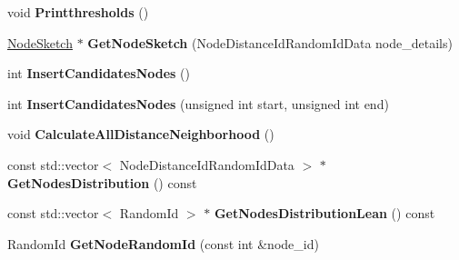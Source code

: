 \begin{DoxyCompactItemize}
\item 
\hypertarget{classall__distance__sketch_1_1GraphSketch_a76a7bed0b3f7d3769ecbeb334a0734b8}{}void {\bfseries Printthresholds} ()\label{classall__distance__sketch_1_1GraphSketch_a76a7bed0b3f7d3769ecbeb334a0734b8}

\item 
\hypertarget{classall__distance__sketch_1_1GraphSketch_a696af8492f42fbbb60afbc2ff2a68a96}{}\hyperlink{classall__distance__sketch_1_1NodeSketch}{Node\+Sketch} $\ast$ {\bfseries Get\+Node\+Sketch} (Node\+Distance\+Id\+Random\+Id\+Data node\+\_\+details)\label{classall__distance__sketch_1_1GraphSketch_a696af8492f42fbbb60afbc2ff2a68a96}

\item 
\hypertarget{classall__distance__sketch_1_1GraphSketch_a5f82eda7cb2dc9ad9460283c026861e4}{}int {\bfseries Insert\+Candidates\+Nodes} ()\label{classall__distance__sketch_1_1GraphSketch_a5f82eda7cb2dc9ad9460283c026861e4}

\item 
\hypertarget{classall__distance__sketch_1_1GraphSketch_aa630b4a199d612823fde932ed70916cd}{}int {\bfseries Insert\+Candidates\+Nodes} (unsigned int start, unsigned int end)\label{classall__distance__sketch_1_1GraphSketch_aa630b4a199d612823fde932ed70916cd}

\item 
\hypertarget{classall__distance__sketch_1_1GraphSketch_a84dbd59d7a2b5b300f07ca93a8002260}{}void {\bfseries Calculate\+All\+Distance\+Neighborhood} ()\label{classall__distance__sketch_1_1GraphSketch_a84dbd59d7a2b5b300f07ca93a8002260}

\item 
\hypertarget{classall__distance__sketch_1_1GraphSketch_ae31e8b23fc7063927b2368a06bc57adb}{}const std\+::vector$<$ Node\+Distance\+Id\+Random\+Id\+Data $>$ $\ast$ {\bfseries Get\+Nodes\+Distribution} () const \label{classall__distance__sketch_1_1GraphSketch_ae31e8b23fc7063927b2368a06bc57adb}

\item 
\hypertarget{classall__distance__sketch_1_1GraphSketch_af463db872f2cc5cc635dffe4aaf136e6}{}const std\+::vector$<$ Random\+Id $>$ $\ast$ {\bfseries Get\+Nodes\+Distribution\+Lean} () const \label{classall__distance__sketch_1_1GraphSketch_af463db872f2cc5cc635dffe4aaf136e6}

\item 
\hypertarget{classall__distance__sketch_1_1GraphSketch_af9bbe3a02d29880b7218c52b53375e31}{}Random\+Id {\bfseries Get\+Node\+Random\+Id} (const int \&node\+\_\+id)\label{classall__distance__sketch_1_1GraphSketch_af9bbe3a02d29880b7218c52b53375e31}


\end{DoxyCompactItemize}
